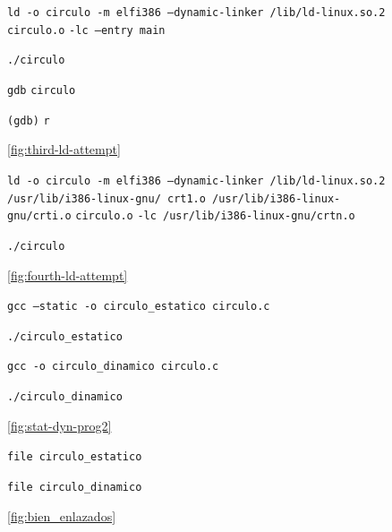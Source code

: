 \documentclass[11pt]{article}
\newcommand{\codetext}[2]{\large\texttt{\textcolor{#1}{#2}}}
\newcommand{\imagecaption}[1]{\vspace{-7pt}\caption*{\char91\ref{fig:#1}\char93}}
\begin{document}
		\begin{figure}[H]
			\centering
			\begin{code-box}
				\codetext{light-blue}{ld }\codetext{orange-desert-vim}{-o circulo -m elf\textunderscore\/i386 --dynamic-linker /lib/ld-linux.so.2} \codetext{light-red}{circulo.o} \codetext{orange-desert-vim}{-lc --entry main}
				
				\codetext{light-blue}{./circulo}
				
				\codetext{light-blue}{gdb} \codetext{light-red}{circulo}
				
				\codetext{light-green}{(gdb)} \codetext{light-blue}{r}
			\end{code-box}
			\imagecaption{third-ld-attempt}
		\end{figure}
		
		\begin{figure}[H]
			\centering
			\begin{code-box}
				\codetext{light-blue}{ld }\codetext{orange-desert-vim}{-o circulo -m elf\textunderscore\/i386 --dynamic-linker /lib/ld-linux.so.2 /usr/lib/i386-linux-gnu/ crt1.o /usr/lib/i386-linux-gnu/crti.o} \codetext{light-red}{circulo.o} \codetext{orange-desert-vim}{-lc /usr/lib/i386-linux-gnu/crtn.o}
				
				\codetext{light-blue}{./circulo}
			\end{code-box}
			\imagecaption{fourth-ld-attempt}
		\end{figure}
	
		
		\begin{figure}[H]
			\centering
			\begin{code-box}
				\codetext{light-blue}{gcc }\codetext{orange-desert-vim}{--static -o circulo\_estatico }\codetext{light-red}{circulo.c}
				
				\codetext{light-blue}{./circulo\_estatico}\newline
				
				\codetext{light-blue}{gcc }\codetext{orange-desert-vim}{-o circulo\_dinamico }\codetext{light-red}{circulo.c}
				
				\codetext{light-blue}{./circulo\_dinamico}
			\end{code-box}
			\imagecaption{stat-dyn-prog2}
		\end{figure}
		
		\begin{figure}[H]
			\centering
			\begin{code-box}
				\codetext{light-blue}{file }\codetext{light-red}{circulo\_estatico}
				
				\codetext{light-blue}{file }\codetext{light-red}{circulo\_dinamico}
				
			\end{code-box}
			\imagecaption{bien_enlazados}
		\end{figure}
		
\end{document}
